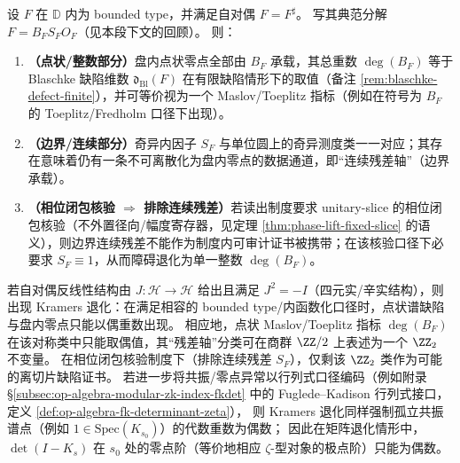 \begin{proposition}\label{prop:selfdual-maslov-singular-dichotomy}
设 \(F\) 在 \(\mathbb{D}\) 内为 bounded type，并满足自对偶 \(F=F^\sharp\)。
写其典范分解 \(F=B_F S_F O_F\)（见本段下文的回顾）。
则：
\begin{enumerate}
  \item \textbf{（点状/整数部分）}盘内点状零点全部由 \(B_F\) 承载，其总重数 \(\deg(B_F)\) 等于 Blaschke 缺陷维数 \(\mathfrak d_{\mathrm{Bl}}(F)\) 在有限缺陷情形下的取值（备注 \ref{rem:blaschke-defect-finite}），并可等价视为一个 Maslov/Toeplitz 指标（例如在符号为 \(B_F\) 的 Toeplitz/Fredholm 口径下出现）。
  \item \textbf{（边界/连续部分）}奇异内因子 \(S_F\) 与单位圆上的奇异测度类一一对应；其存在意味着仍有一条不可离散化为盘内零点的数据通道，即“连续残差轴”（边界承载）。
  \item \textbf{（相位闭包核验 \(\Rightarrow\) 排除连续残差）}若读出制度要求 unitary-slice 的相位闭包核验（不外置径向/幅度寄存器，见定理 \ref{thm:phase-lift-fixed-slice} 的语义），则边界连续残差不能作为制度内可审计证书被携带；在该核验口径下必要求 \(S_F\equiv 1\)，从而障碍退化为单一整数 \(\deg(B_F)\)。
\end{enumerate}
\end{proposition}

\begin{remark}[四元实型（\(J^2=-I\)）的偶重数与 \texorpdfstring{$\ZZ_2$}{Z2} 指标化]\label{rem:selfdual-quaternionic-z2}
若自对偶反线性结构由 \(J:\mathcal H\to\mathcal H\) 给出且满足 \(J^2=-I\)（四元实/辛实结构），则出现 Kramers 退化：在满足相容的 bounded type/内函数化口径时，点状谱缺陷与盘内零点只能以偶重数出现。
相应地，点状 Maslov/Toeplitz 指标 \(\deg(B_F)\) 在该对称类中只能取偶值，其“残差轴”分类可在商群 \(\ZZ/2\) 上表述为一个 \(\ZZ_2\) 不变量。
在相位闭包核验制度下（排除连续残差 \(S_F\)），仅剩该 \(\ZZ_2\) 类作为可能的离切片缺陷证书。
若进一步将共振/零点异常以行列式口径编码（例如附录 \S\ref{subsec:op-algebra-modular-zk-index-fkdet} 中的 Fuglede--Kadison 行列式接口，定义 \ref{def:op-algebra-fk-determinant-zeta}），
则 Kramers 退化同样强制孤立共振谱点（例如 \(1\in\mathrm{Spec}(K_{s_0})\)）的代数重数为偶数；
因此在矩阵退化情形中，\(\det(I-K_s)\) 在 \(s_0\) 处的零点阶（等价地相应 \(\zeta\)-型对象的极点阶）只能为偶数。
\end{remark}


